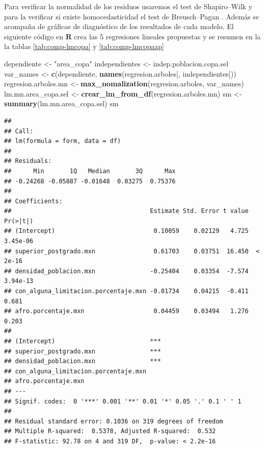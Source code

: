 \documentclass[12pt,]{book}
\newenvironment{Shaded}{\begin{snugshade}}{\end{snugshade}}
\newcommand{\KeywordTok}[1]{\textcolor[rgb]{0.13,0.29,0.53}{\textbf{#1}}}
\newcommand{\StringTok}[1]{\textcolor[rgb]{0.31,0.60,0.02}{#1}}
\newcommand{\NormalTok}[1]{#1}
\begin{document}
Para verificar la normalidad de los residuos usaremos el test de
Shapiro--Wilk \citep[ ]{shapiro1965analysis} y para la verificar si
existe homocedasticidad el test de Breusch--Pagan
\citep{breusch1979simple}. Además se acompaña de gráficas de diagnóstico
de los resultados de cada modelo. El siguiente código en \textbf{R} crea
las 5 regresiones lineales propuestas y se resumen en la la tablas
\ref{tab:comp-lmcopa} y \ref{tab:comp-lmcopaap}

\begin{Shaded}
\begin{Highlighting}[]
\NormalTok{dependiente <-}\StringTok{ "area_copa"}
\NormalTok{independientes <-}\StringTok{ }\NormalTok{indep.poblacion.copa.sel}
\NormalTok{var_names <-}\StringTok{ }\KeywordTok{c}\NormalTok{(dependiente, }\KeywordTok{names}\NormalTok{(regresion.arboles[, independientes]))}
\NormalTok{regresion.arboles.mn <-}\StringTok{ }\KeywordTok{max_nomalization}\NormalTok{(regresion.arboles, var_names)}
\NormalTok{lm.mn.area_copa.sel <-}\StringTok{ }\KeywordTok{crear_lm_from_df}\NormalTok{(regresion.arboles.mn)}
\NormalTok{sm <-}\StringTok{ }\KeywordTok{summary}\NormalTok{(lm.mn.area_copa.sel)}
\NormalTok{sm}
\end{Highlighting}
\end{Shaded}

\begin{verbatim}
## 
## Call:
## lm(formula = form, data = df)
## 
## Residuals:
##      Min       1Q   Median       3Q      Max 
## -0.24268 -0.05887 -0.01648  0.03275  0.75376 
## 
## Coefficients:
##                                      Estimate Std. Error t value Pr(>|t|)
## (Intercept)                           0.10059    0.02129   4.725 3.45e-06
## superior_postgrado.mxn                0.61703    0.03751  16.450  < 2e-16
## densidad_poblacion.mxn               -0.25404    0.03354  -7.574 3.94e-13
## con_alguna_limitacion.porcentaje.mxn -0.01734    0.04215  -0.411    0.681
## afro.porcentaje.mxn                   0.04459    0.03494   1.276    0.203
##                                         
## (Intercept)                          ***
## superior_postgrado.mxn               ***
## densidad_poblacion.mxn               ***
## con_alguna_limitacion.porcentaje.mxn    
## afro.porcentaje.mxn                     
## ---
## Signif. codes:  0 '***' 0.001 '**' 0.01 '*' 0.05 '.' 0.1 ' ' 1
## 
## Residual standard error: 0.1036 on 319 degrees of freedom
## Multiple R-squared:  0.5378, Adjusted R-squared:  0.532 
## F-statistic: 92.78 on 4 and 319 DF,  p-value: < 2.2e-16
\end{verbatim}
\end{document}
